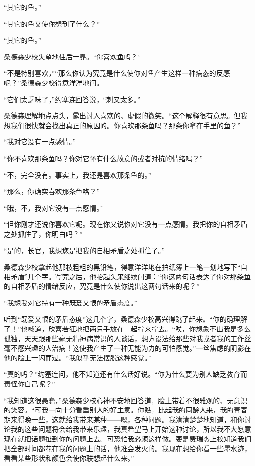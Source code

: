     “其它的鱼。”

    “其它的鱼又使你想到了什么？”

    “其它的鱼。”

    桑德森少校失望地往后一靠。“你喜欢鱼吗？”

    “不是特别喜欢，”“那么你认为究竟是什么使你对鱼产生这样一种病态的反感呢？”桑德森少校得意洋洋地问。

    “它们太乏味了，”约塞连回答说，“刺又太多。”

    桑德森理解地点点头，露出讨人喜欢的、虚假的微笑。“这个解释很有意思。但我想我们很快就会找出真正的原因的。你喜欢那条鱼吗？那条你拿在手里的鱼？”

    “我对它没有一点感情。”

    “你不喜欢那条鱼吗？你对它怀有什么故意的或者对抗的情绪吗？”

    “不，完全没有。事实上，我还是喜欢那条鱼的。”

    “那么，你确实喜欢那条鱼咯？”

    “哦，不，我对它没有一点感情。”

    “但你刚才还说你喜欢它呢。现在你又说你对它没有一点感情。我把你的自相矛盾之处抓住了，你明白吗？”

    “是的，长官，我想您是把我的自相矛盾之处抓住了。”

    桑德森少校拿起他那枝粗粗的黑铅笔，得意洋洋地在拍纸簿上一笔一划地写下“自相矛盾”几个字。写完之后，他抬起头来继续问道：“你这两句话表达了你对那条鱼的自相矛盾的情绪反应，究竟是什么使你说出这两句话来的呢？”

    “我想我对它持有一种既爱又恨的矛盾态度。”

    听到“既爱又恨的矛盾态度”这几个字，桑德森少校高兴得跳了起来。“你的确理解了！”他喊道，欣喜若狂地把两只手放在一起拧来拧去。“唉，你想象不出我是多么孤独，天天跟那些毫无精神病常识的人谈话，想方设法给那些对我或者我的工作丝毫不感兴趣的人治病！这使我产生了一种无能为力的可怕感觉。”一丝焦虑的阴影在他的脸上一闪而过。“我似乎无法摆脱这种感觉。”

    “真的吗？”约塞连问，他不知道还有什么话好说。“你为什么要为别人缺乏教育而责怪你自己呢？”

    “我知道这很愚蠢，”桑德森少校心神不安地回答道，脸上带着不很雅观的、无意识的笑容。“可我一向十分看重别人的好主意。你瞧，比起我的同龄人来，我的青春期来得晚一些，这就给我带来某种——嗯，各种问题。我清清楚楚地知道，和你讨论我的这些问题将会给我带来乐趣，我真希望马上开始这种讨论，所以我不大愿意现在就把话题扯到你的问题上去。可恐怕我必须这样做。要是费瑞杰上校知道我们把全部时间都花在我的问题上的话，他准会发火的。我现在想给你看一些墨水迹，看看某些形状和颜色会使你联想起什么来。”

